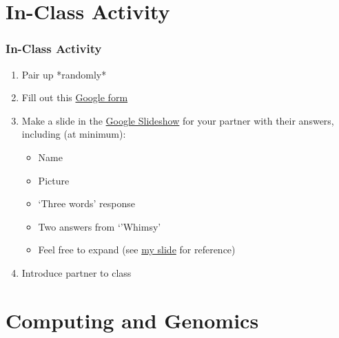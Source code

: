 \documentclass{beamer}
\begin{document}
\section{In-Class Activity}

\begin{frame}
\frametitle{In-Class Activity}
	\begin{enumerate}
	\item<1-> Pair up *randomly*
	\item<2-> Fill out this \href{https://goo.gl/forms/fnCaNIcwQiNiawcv1}{Google form}
	\item<3-> Make a slide in the \href{https://docs.google.com/presentation/d/1WxVQJGrBO8NxQ2ZJwvZy2W61qAQYqN9V8a_xRUflU7w/edit?usp=sharing}{Google Slideshow} for your partner with their answers, including (at minimum):
		\begin{itemize}
		\item<4-> Name
		\item<4-> Picture
		\item<4-> `Three words' response
		\item<4-> Two answers from `'Whimsy'
		\item<4-> Feel free to expand (see \href{https://docs.google.com/presentation/d/1WxVQJGrBO8NxQ2ZJwvZy2W61qAQYqN9V8a_xRUflU7w/edit?usp=sharing}{my slide} for reference)
		\end{itemize}
	\item<5-> Introduce partner to class
	\end{enumerate}
\end{frame}

\section{Computing and Genomics}
\end{document}
